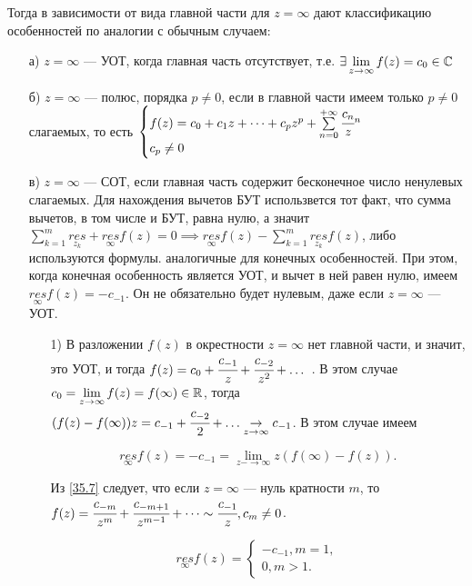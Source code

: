 \documentclass[../../main.tex]{subfiles}
\begin{document}
	 Тогда в зависимости от вида главной части для $z=\infty$ дают классификацию особенностей по аналогии с обычным случаем:
	 \begin{itemize}
	 	\item[а)] $z=\infty$ --- УОТ, когда главная часть отсутствует, т.е.
	 	$\exists\lim\limits_{z\rightarrow \infty} f(z)=c_0\in \mathbb{C}$
	 	\item[б)] $z=\infty$ --- полюс, порядка $p\neq 0$, если в 
	 	главной части имеем только $p\neq 0$ слагаемых, то есть 
	 	$
	 	\begin{cases}
	 	f(z)=c_0+c_1z+\dots+c_pz^p+\sum\limits_{n=0}^{+\infty}\cfrac{c_n}
	 	z^n\\
	c_p\neq 0
	 	\end{cases}
	 	$ 
	 \item[в)] $z=\infty$ --- СОТ, если главная часть содержит бесконечное число ненулевых слагаемых. Для нахождения вычетов БУТ использвется тот факт, что сумма вычетов, в том числе и БУТ, равна нулю, а значит 
	 $\sum\limits_{k=1}^m\underset{z_k}{res}+\underset{\infty}{res}f(z)=0 \implies\underset{\infty}{res}f(z)-\sum\limits_{k=1}^m \underset{z_k}{res}f(z)$, либо используются формулы. аналогичные для конечных особенностей. При этом, когда конечная особенность является УОТ, и вычет в ней равен нулю, имеем 	$\underset{\infty}{res}f(z)=-c_{-1}.$ Он не обязательно будет нулевым, даже если $z=\infty$ --- УОТ.
	 
	 \begin{itemize}
	 	\item[1)] В разложении $f(z)$ в окрестности $z=\infty$ нет главной части, и значит, это УОТ, и тогда $f(z)=c_0+\cfrac{c_{-1}}{z}+\cfrac{c_{-2}}{z^2}+ \dots$ . В этом случае 
	 	$c_0=\lim\limits_{z\rightarrow \infty}f(z)=f(\infty)\in \mathbb{R}$, тогда 
	 	$(f(z)-f(\infty))z=c_{-1}+\cfrac{c_{-2}}{2}+\dots\underset{z\rightarrow\infty}{\rightarrow}c_{-1}$. В этом случае имеем 	
	 	
	 	\begin{equation}\label{35.7}
	 	\underset{\infty}{res}f(z)=-c_{-1}=\lim\limits_{z-\rightarrow\infty}z(f(\infty)-f(z)).
	 	\end{equation}
	 	
	 	Из \ref{35.7} следует, что если $z=\infty$ --- нуль кратности $m$, то $f(z)=\cfrac{c_{-m}}{z^m}+\cfrac{c_{-m+1}}{z^{m-1}}+\dots\sim \cfrac{c_{-1}}{z}, c_m\neq0$.
	 
	 	\[
	 	\underset{\infty}{res}f(z)=
	 	\begin{cases}
	 		-c_{-1}, m=1,\\
	 		0, m>1.
	 	\end{cases}
	 	\]
	 	

\end{itemize}
\end{itemize}
\end{document}
